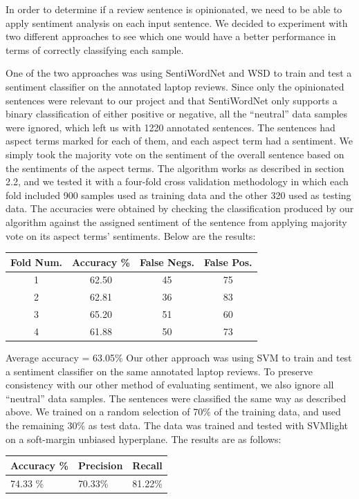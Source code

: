 \documentclass{article}
\begin{document}
In order to determine if a review sentence is opinionated, we need to be able to apply sentiment analysis on each input sentence. We decided to experiment with two different approaches to see which one would have a better performance in terms of correctly classifying each sample. 

One of the two approaches was using SentiWordNet and WSD to train and test a sentiment classifier on the annotated laptop reviews. Since only the opinionated sentences were relevant to our project and that SentiWordNet only supports a binary classification of either positive or negative, all the “neutral” data samples were ignored, which left us with 1220 annotated sentences. The sentences had aspect terms marked for each of them, and each aspect term had a sentiment. We simply took the majority vote on the sentiment of the overall sentence based on the sentiments of the aspect terms. The algorithm works as described in section 2.2, and we tested it with a four-fold cross validation methodology in which each fold included 900 samples used as training data and the other 320 used as testing data. The accuracies were obtained by checking the classification produced by our algorithm against the assigned sentiment of the sentence from applying majority vote on its aspect terms’ sentiments. Below are the results:

\begin{tabular}{|c|c|c|c|}
\hline 
Fold Num. & Accuracy \% & False Negs. & False Pos. \\ 
\hline
1 & 62.50 & 45 & 75 \\ \hline
2 & 62.81 & 36 & 83 \\ \hline
3 & 65.20 & 51 & 60 \\ \hline
4 & 61.88 & 50 & 73 \\ \hline
\end{tabular}

Average accuracy = 63.05\% \newline
Our other approach was using SVM to train and test a sentiment classifier on the same annotated laptop reviews. To preserve consistency with our other method of evaluating sentiment, we also ignore all “neutral” data samples. The sentences were classified the same way as described above. We trained on a random selection of 70$\%$ of the training data, and used the remaining 30$\%$ as test data. The data was trained and tested with SVMlight on a soft-margin unbiased hyperplane. The results are as follows: 

\begin{tabularx}{\linewidth}{ |X|X|X| }
\hline 
Accuracy \% & Precision & Recall \\ 
\hline
74.33 \% & 70.33\% & 81.22\% \\ \hline 
\end{tabularx}
\end{document}
